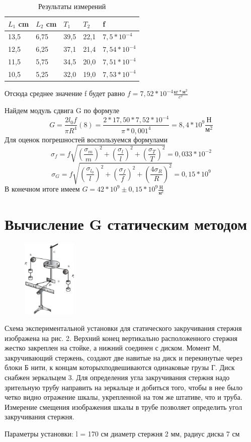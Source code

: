 \documentclass[a4paper]{article}
\begin{document}
\begin{table}[!h]
    \begin{center}
    \begin{tabular}{|l|l|l|l|l|}
    \hline
    $L_{1}$ cm &$L_{2}$ cm& $T_{1}$& $T_{2}$& f \\ \hline
    13,5& 6,75& 39,5& 22,1& $7,5*10^{-4}$ \\ \hline
    12,5& 6,25& 37,1& 21,4& $7,54*10^{-4}$ \\ \hline
    11,5& 5,75& 34,5& 20,0& $7,51*10^{-4}$ \\ \hline
    10,5& 5,25& 32,0& 19,0& $7,53*10^{-4}$ \\ \hline
\end{tabular}
\caption{Результаты измерений}
\end{center}
\end{table}
Отсюда среднее значение f будет равно $f= 7,52*10^{-4} \frac{\text{кг}*\text{м}^{2}}{c^2}$\par
Найдем модуль сдвига G по формуле 
\[G = \frac{2l_{0}f}{\pi R^{4}}(8) = \frac{2*17,50*7,52*10^{-4}}{\pi *0,001^{4}} = 8,4*10^{9} \frac{\text{Н}}{\text{м}^{2}} \]
Для оценок погрешностей воспользуемся формулами
\[\sigma_{f}= f\sqrt{(\frac{\sigma_{m}}{m})^{2} + (\frac{\sigma_{l}}{l} )^{2}+(\frac{\sigma_{T}}{T} )^2} = 0,033*10^{-2}\] 
\[\sigma_{G}= f\sqrt{(\frac{\sigma_{l_{0}}}{l})^{2} + (\frac{\sigma_{f}}{f} )^{2}+(\frac{4\sigma_{R}}{R} )^2} = 0,15*10^{9}\]
В конечном итоге имеем $G =42*10^{9}\pm 0,15*10^{9} \frac{\text{Н}}{\text{м}^{2}} $ 
\newpage
\section{Вычисление G статическим методом}
\begin{figure}
    \centering
    \includegraphics[width=0.23\textwidth]{pick2.jpg}
\end{figure}
Схема экспериментальной установки для статического закручивания стержня изображена на рис. 2. Верхний конец вертикально расположенного стержня  жестко закреплен на стойке, а нижний соединен
с диском. Момент М, закручивающий стержень, создают две навитые на диск и перекинутые через блоки Б нити, к концам которыхподвешиваются одинаковые грузы Г. Диск снабжен зеркальцем 3. Для
определения угла закручивания стержня надо зрительную трубу направить на зеркальце и добиться того, чтобы в нее было четко видно
отражение шкалы, укрепленной на том же штативе, что и труба. Измерение смещения изображения шкалы в трубе позволяет определить
угол закручивания стержня.\par
Параметры установки: l = 170 см диаметр стержня 2 мм, радиус диска 7 см
\end{document}
